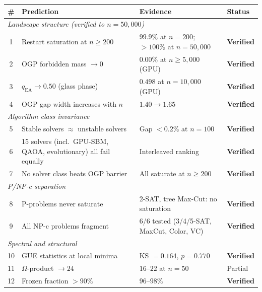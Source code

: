 \documentclass[11pt,a4paper]{article}
\theoremstyle{plain}
\theoremstyle{definition}
\theoremstyle{remark}
\begin{document}
\begin{center}\small
\begin{tabular}{clp{4cm}l}
\toprule
\# & Prediction & Evidence & Status \\
\midrule
\multicolumn{4}{l}{\textit{Landscape structure (verified to $n = 50{,}000$)}} \\
1 & Restart saturation at $n \geq 200$ & $99.9\%$ at $n=200$; $>100\%$ at $n=50{,}000$ & \textcolor{proved}{\textbf{Verified}} \\
2 & OGP forbidden mass $\to 0$ & $0.00\%$ at $n \geq 5{,}000$ (GPU) & \textcolor{proved}{\textbf{Verified}} \\
3 & $q_{\text{EA}} \to 0.50$ (glass phase) & $0.498$ at $n = 10{,}000$ (GPU) & \textcolor{proved}{\textbf{Verified}} \\
4 & OGP gap width increases with $n$ & $1.40 \to 1.65$ & \textcolor{proved}{\textbf{Verified}} \\
\midrule
\multicolumn{4}{l}{\textit{Algorithm class invariance}} \\
5 & Stable solvers $\approx$ unstable solvers & Gap $< 0.2\%$ at $n = 100$ & \textcolor{proved}{\textbf{Verified}} \\
6 & 15 solvers (incl.\ GPU-SBM, QAOA, evolutionary) all fail equally & Interleaved ranking & \textcolor{proved}{\textbf{Verified}} \\
7 & No solver class beats OGP barrier & All saturate at $n \geq 200$ & \textcolor{proved}{\textbf{Verified}} \\
\midrule
\multicolumn{4}{l}{\textit{P/NP-c separation}} \\
8 & P-problems never saturate & 2-SAT, tree Max-Cut: no saturation & \textcolor{proved}{\textbf{Verified}} \\
9 & All NP-c problems fragment & 6/6 tested (3/4/5-SAT, MaxCut, Color, VC) & \textcolor{proved}{\textbf{Verified}} \\
\midrule
\multicolumn{4}{l}{\textit{Spectral and structural}} \\
10 & GUE statistics at local minima & KS $= 0.164$, $p = 0.770$ & \textcolor{proved}{\textbf{Verified}} \\
11 & $\Omega$-product $\to 24$ & $16$--$22$ at $n = 50$ & \textcolor{conjectural}{Partial} \\
12 & Frozen fraction $> 90\%$ & $96$--$98\%$ & \textcolor{proved}{\textbf{Verified}} \\
\bottomrule
\end{tabular}
\end{center}
\end{document}
